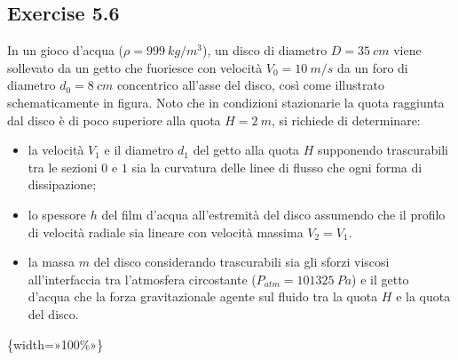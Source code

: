 \documentclass[letterpaper,10pt,italian]{jupyterBook}
\begin{document}
\subsection{Exercise 5.6}
\label{\detokenize{polimi/fluidmechanics-ita/template/capitoli/05_bernoulli/0507in:exercise-5-6}}\label{\detokenize{polimi/fluidmechanics-ita/template/capitoli/05_bernoulli/0507in:fluid-mechanics-bernoulli-ex-06}}\label{\detokenize{polimi/fluidmechanics-ita/template/capitoli/05_bernoulli/0507in::doc}}
\sphinxAtStartPar
In un gioco d’acqua (\(\rho=999\ kg/m^3\)), un disco di diametro
\(D=35\ cm\) viene sollevato da un getto che fuoriesce con velocità
\(V_0=10\ m/s\) da un foro di diametro \(d_0=8\ cm\) concentrico all’asse
del disco, così come illustrato schematicamente in figura. Noto che in
condizioni stazionarie la quota raggiunta dal disco è di poco superiore
alla quota \(H=2\ m\), si richiede di determinare:
\begin{itemize}
\item {} 
\sphinxAtStartPar
la velocità \(V_1\) e il diametro \(d_1\) del getto alla quota \(H\)
supponendo trascurabili tra le sezioni \(0\) e \(1\) sia la curvatura
delle linee di flusso che ogni forma di dissipazione;

\item {} 
\sphinxAtStartPar
lo spessore \(h\) del film d’acqua all’estremità del disco assumendo
che il profilo di velocità radiale sia lineare con velocità massima
\(V_2=V_1\).

\item {} 
\sphinxAtStartPar
la massa \(m\) del disco considerando trascurabili sia gli sforzi
viscosi all’interfaccia tra l’atmosfera circostante
(\(P_{atm}=101325\ Pa\)) e il getto d’acqua che la forza
gravitazionale agente sul fluido tra la quota \(H\) e la quota del
disco.

\end{itemize}

\sphinxAtStartPar
{}

\sphinxAtStartPar
{}\{width=»100\%»\}
\end{document}
